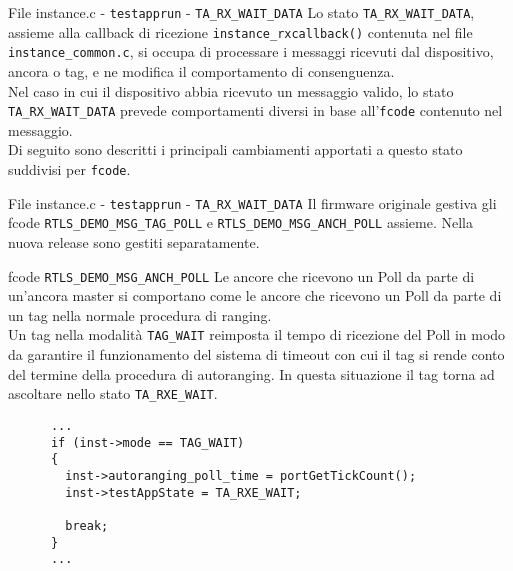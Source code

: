 \begin{frame}{File instance.c - \lstinline!testapprun! - \lstinline!TA_RX_WAIT_DATA!}
  Lo stato \lstinline!TA_RX_WAIT_DATA!, assieme alla callback di ricezione \lstinline!instance_rxcallback()!
  contenuta nel file \lstinline!instance_common.c!, si occupa di processare i messaggi ricevuti dal dispositivo,
  ancora o tag, e ne modifica il comportamento di consenguenza.\\
  Nel caso in cui il dispositivo abbia ricevuto un messaggio valido, lo stato \lstinline!TA_RX_WAIT_DATA!
  prevede comportamenti diversi in base all'\lstinline!fcode! contenuto nel messaggio.\\
  Di seguito sono descritti i principali \alert{cambiamenti} apportati a questo stato suddivisi
  per \lstinline!fcode!.
\end{frame}

\begin{frame}[fragile, shrink=30]{File instance.c - \lstinline!testapprun! - \lstinline!TA_RX_WAIT_DATA!}
  Il firmware originale gestiva gli fcode \lstinline!RTLS_DEMO_MSG_TAG_POLL! e
  \lstinline!RTLS_DEMO_MSG_ANCH_POLL! assieme. Nella nuova release sono gestiti separatamente.
  \begin{block}{fcode \lstinline!RTLS_DEMO_MSG_ANCH_POLL!}
    Le ancore che ricevono un Poll da parte di un'ancora master si comportano come le ancore
    che ricevono un Poll da parte di un tag nella normale procedura di ranging.\\
    Un tag nella modalità \lstinline!TAG_WAIT! reimposta il tempo di ricezione del Poll in modo
    da garantire il funzionamento del sistema di timeout con cui il tag si rende conto del termine
    della procedura di autoranging. In questa situazione il tag torna ad ascoltare nello stato
    \lstinline!TA_RXE_WAIT!.
    \begin{lstlisting}
      ...
      if (inst->mode == TAG_WAIT)
      {
        inst->autoranging_poll_time = portGetTickCount();
        inst->testAppState = TA_RXE_WAIT;

        break;
      }
      ...
    \end{lstlisting}
  \end{block}
\end{frame}

